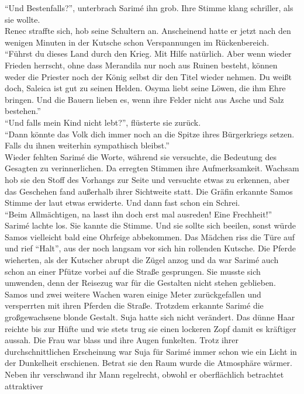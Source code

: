 ``Und Bestenfalls?'', unterbrach Sarimé ihn grob. Ihre Stimme klang schriller, als sie wollte.\\
Renec straffte sich, hob seine Schultern an. Anscheinend hatte er jetzt nach den wenigen Minuten in 
der Kutsche schon Verspannungen im Rückenbereich. ``Führst du dieses Land durch den Krieg. Mit 
Hilfe natürlich. Aber wenn wieder Frieden herrscht, ohne dass Merandila nur noch aus Ruinen 
besteht, können weder die Priester noch der König selbst dir den Titel wieder nehmen. Du weißt 
doch, Saleica ist gut zu seinen Helden. Osyma liebt seine Löwen, die ihm Ehre bringen. Und die 
Bauern lieben es, wenn ihre Felder nicht aus Asche und Salz bestehen.''\\
``Und falls mein Kind nicht lebt?'', flüsterte sie zurück.\\
``Dann könnte das Volk dich immer noch an die Spitze ihres Bürgerkriegs setzen. Falls du ihnen 
weiterhin sympathisch bleibst.''\\
Wieder fehlten Sarimé die Worte, während sie versuchte, die Bedeutung des Gesagten zu 
verinnerlichen. Da erregten Stimmen ihre Aufmerksamkeit. Wachsam hob sie den Stoff des Vorhangs zur 
Seite und versuchte etwas zu erkennen, aber das Geschehen fand außerhalb ihrer Sichtweite statt. 
Die Gräfin erkannte Samos Stimme der laut etwas erwiderte. Und dann fast schon ein Schrei.\\
``Beim Allmächtigen, na lasst ihn doch erst mal ausreden! Eine Frechheit!''\\
Sarimé lachte los. Sie kannte die Stimme. Und sie sollte sich beeilen, sonst würde Samos vielleicht 
bald eine Ohrfeige abbekommen. Das Mädchen riss die Türe auf und rief ``Halt'', aus der noch 
langsam vor sich hin rollenden Kutsche. Die Pferde wieherten, als der Kutscher abrupt die Zügel 
anzog und da war Sarimé auch schon an einer Pfütze vorbei auf die Straße gesprungen. Sie musste sich 
umwenden, denn der Reisezug war für die Gestalten nicht stehen geblieben. Samos und zwei weitere 
Wachen waren einige Meter zurückgefallen und versperrten mit ihren Pferden die Straße. Trotzdem 
erkannte Sarimé die großgewachsene blonde Gestalt. Suja hatte sich nicht verändert. Das dünne Haar 
reichte bis zur Hüfte und wie stets trug sie einen lockeren Zopf damit es kräftiger aussah. Die Frau 
war blass und ihre Augen funkelten. Trotz ihrer durchschnittlichen Erscheinung war Suja für Sarimé 
immer schon wie ein Licht in der Dunkelheit erschienen. Betrat sie den Raum wurde die Atmosphäre 
wärmer. Neben ihr verschwand ihr Mann regelrecht, obwohl er oberflächlich betrachtet attraktiver 

